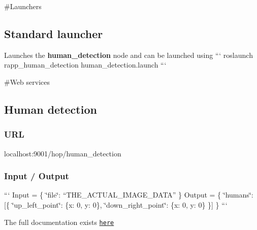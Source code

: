 \#\-Launchers

\subsection*{Standard launcher}

Launches the {\bfseries human\-\_\-detection} node and can be launched using ``` roslaunch rapp\-\_\-human\-\_\-detection human\-\_\-detection.\-launch ```

\#\-Web services

\subsection*{Human detection}

\subsubsection*{U\-R\-L}

{\ttfamily localhost\-:9001/hop/human\-\_\-detection}

\subsubsection*{Input / Output}

``` Input = \{ \char`\"{}file\char`\"{}\-: “\-T\-H\-E\-\_\-\-A\-C\-T\-U\-A\-L\-\_\-\-I\-M\-A\-G\-E\-\_\-\-D\-A\-T\-A” \} {\ttfamily  } Output = \{ \char`\"{}humans\char`\"{}\-: \mbox{[}\{ \char`\"{}up\-\_\-left\-\_\-point\char`\"{}\-: \{x\-: 0, y\-: 0\}, \char`\"{}down\-\_\-right\-\_\-point\char`\"{}\-: \{x\-: 0, y\-: 0\} \}\mbox{]} \} ```

The full documentation exists \href{https://github.com/rapp-project/rapp-platform/tree/master/rapp_web_services/services#human-detection}{\tt here} 